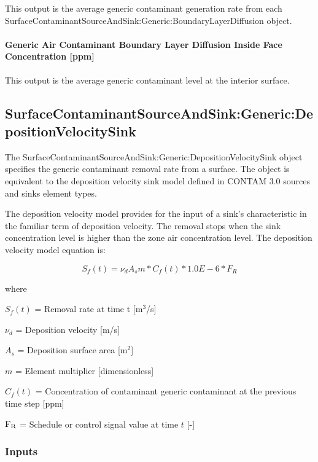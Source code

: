 This output is the average generic contaminant generation rate from each Sur\-face\-Contaminant\-Source\-And\-Sink:\-Generic:\-Boundary\-Layer\-Diffusion object.

\paragraph{Generic Air Contaminant Boundary Layer Diffusion Inside Face Concentration {[}ppm{]}}\label{generic-air-contaminant-boundary-layer-diffusion-inside-face-concentration-ppm}

This output is the average generic contaminant level at the interior surface.

\subsection{Sur\-face\-Contaminant\-Source\-And\-Sink:\-Generic:\-Deposition\-Velocity\-Sink}\label{surfacecontaminantsourceandsinkgenericdepositionvelocitysink}

The Sur\-face\-Contaminant\-Source\-And\-Sink:\-Generic:\-Deposition\-Velocity\-Sink object specifies the generic contaminant removal rate from a surface. The object is equivalent to the deposition velocity sink model defined in CONTAM 3.0 sources and sinks element types.

The deposition velocity model provides for the input of a sink's characteristic in the familiar term of deposition velocity. The removal stops when the sink concentration level is higher than the zone air concentration level. The deposition velocity model equation is:

\begin{equation}
{S_f}(t) = {\nu_d}{A_s}m*{C_f}(t)*1.0E - 6*F{}_R
\end{equation}

where

\(S_f (t)\) = Removal rate at time t {[}m\(^{3}\)/s{]}

\(\nu_d\) = Deposition velocity {[}m/s{]}

\(A_s\) = Deposition surface area {[}m\(^{2}\){]}

\(m\) = Element multiplier {[}dimensionless{]}

\(C_f (t)\) = Concentration of contaminant generic contaminant at the previous time step {[}ppm{]}

\(\rm{F}_{R}\) = Schedule or control signal value at time \(t\) {[}-{]}

\subsubsection{Inputs}\label{inputs-16-005}


